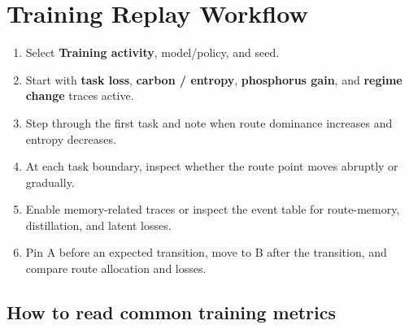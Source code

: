 \documentclass[11pt,a4paper]{article}
\newcommand{\ui}[1]{\textsf{\bfseries #1}}
\begin{document}
\section{Training Replay Workflow}

\begin{procedurebox}
\begin{enumerate}
  \item Select \ui{Training activity}, model/policy, and seed.
  \item Start with \ui{task loss}, \ui{carbon / entropy}, \ui{phosphorus gain}, and \ui{regime change} traces active.
  \item Step through the first task and note when route dominance increases and entropy decreases.
  \item At each task boundary, inspect whether the route point moves abruptly or gradually.
  \item Enable memory-related traces or inspect the event table for route-memory, distillation, and latent losses.
  \item Pin A before an expected transition, move to B after the transition, and compare route allocation and losses.
\end{enumerate}
\end{procedurebox}

\subsection{How to read common training metrics}
\end{document}
